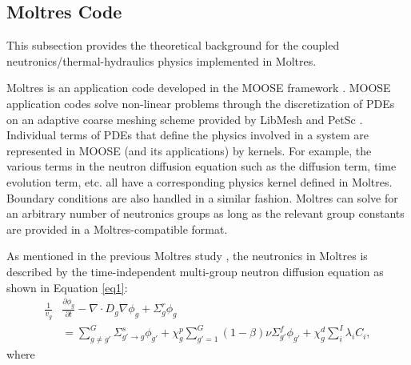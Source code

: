 \documentclass{anstrans}
\begin{document}
\subsection{\textbf{Moltres Code}}

	This subsection provides the theoretical background for the coupled
	neutronics/thermal-hydraulics physics implemented in Moltres.
	
	Moltres is an application code developed in the \gls{MOOSE} framework
	\cite{gaston_moose:_2009}. \gls{MOOSE} application codes solve non-linear
	problems through the discretization of \glspl{PDE} on an adaptive coarse
	meshing scheme provided by LibMesh \cite{kirk_libmesh:_2006} and PetSc
	\cite{satish_balay_petsc_2015}. Individual terms of \glspl{PDE} that define
	the physics involved in a system are represented in \gls{MOOSE} (and its
	applications) by kernels. For example, the various terms in the neutron
	diffusion equation such as the diffusion term, time evolution term, etc.
	all have a corresponding physics kernel defined in Moltres. Boundary
	conditions are also handled in a similar fashion. Moltres can solve for an
	arbitrary number of neutronics groups as long as the relevant group
	constants are provided in a Moltres-compatible format.

	As mentioned in the previous Moltres study
	\cite{lindsay_introduction_2018}, the neutronics in Moltres is described by
	the time-independent multi-group neutron diffusion equation as shown in
	Equation \ref{eq1}:
%
\begin{align}
	\frac{1}{v_g} &\frac{\partial \phi_g}{\partial t} - \nabla \cdot D_g \nabla
	\phi_g + \Sigma^r_g \phi_g \nonumber \\ 
	&= \sum^G_{g \neq g'} \Sigma^s_{g' \rightarrow g} \phi_{g'} + \chi^p_g
	\sum^G_{g'=1} (1-\beta) \nu \Sigma^f_{g'} \phi_{g'} + \chi^d_g \sum^I_i
	\lambda_i C_i, \label{eq1}
\end{align}
%
	where
\end{document}

